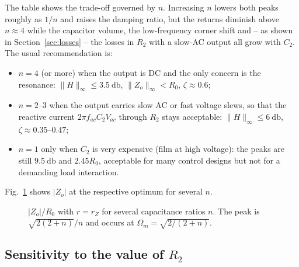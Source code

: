 \documentclass[11pt,a4paper]{article}
\begin{document}
The table shows the trade-off governed by $n$. Increasing $n$ lowers both peaks roughly as
$1/n$ and raises the damping ratio, but the returns diminish above $n \approx 4$ while the
capacitor volume, the low-frequency corner shift and -- as shown in
Section~\ref{sec:losses} -- the losses in $R_2$ with a slow-AC output all grow with $C_2$.
The usual recommendation is:
\begin{itemize}[nosep]
\item $n = 4$ (or more) when the output is DC and the only concern is the resonance:
      $\|H\|_\infty \le \SI{3.5}{\decibel}$, $\|Z_o\|_\infty < R_0$, $\zeta \approx 0.6$;
\item $n = 2$--$3$ when the output carries slow AC or fast voltage slews, so that the
      reactive current $2\pi f_{ac} C_2 V_{ac}$ through $R_2$ stays acceptable:
      $\|H\|_\infty \le \SI{6}{\decibel}$, $\zeta \approx 0.35$--$0.47$;
\item $n = 1$ only when $C_2$ is very expensive (film at high voltage): the peaks are
      still $\SI{9.5}{\decibel}$ and $2.45 R_0$, acceptable for many control designs but
      not for a demanding load interaction.
\end{itemize}
Fig.~\ref{fig:Zn} shows $|Z_o|$ at the respective optimum for several $n$.

\begin{figure}[htb]
\centering
{}
\caption{$|Z_o|/R_0$ with $r = r_Z$ for several capacitance ratios $n$. The peak is
$\sqrt{2(2+n)}/n$ and occurs at $\Omega_m = \sqrt{2/(2+n)}$.}
\label{fig:Zn}
\end{figure}

\subsection{Sensitivity to the value of \texorpdfstring{$R_2$}{R2}}
\end{document}
